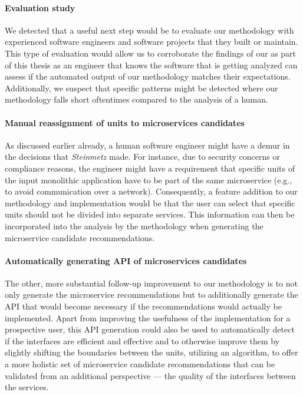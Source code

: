 \documentclass[12pt,a4paper]{report}
\begin{document}
\paragraph{Evaluation study}
We detected that a useful next step would be to
evaluate our methodology with experienced software engineers and software
projects that they built or maintain. This type of evaluation would allow us to
corroborate the findings of our \textit{} as part of
this thesis as an engineer that knows the software that is getting analyzed can
assess if the automated output of our methodology matches their expectations.
Additionally, we suspect that specific patterns might be detected where our
methodology falls short oftentimes compared to the analysis of a human.

\paragraph{Manual reassignment of units to microservices candidates}
As discussed earlier already, a human software engineer might have a demur in the
decisions that \textit{Steinmetz} made. For instance, due to security concerns
or compliance reasons, the engineer might have a requirement that specific
units of the input monolithic application have to be part of the same
microservice (e.g., to avoid communication over a network). Consequently, a
feature addition to our methodology and implementation would be that the user
can select that specific units should not be divided into separate services.
This information can then be incorporated into the analysis by the methodology
when generating the microservice candidate recommendations.

\paragraph{Automatically generating API of microservices candidates}
The other, more substantial follow-up improvement to our methodology is to not only
generate the microservice recommendations but to additionally generate the API
that would become necessary if the recommendations would actually be
implemented. Apart from improving the usefulness of the implementation for a
prospective user, this API generation could also be used to automatically
detect if the interfaces are efficient and effective and to otherwise improve
them by slightly shifting the boundaries between the units, utilizing an
algorithm, to offer a more holistic set of microservice candidate
recommendations that can be validated from an additional perspective --- the
quality of the interfaces between the services.
\end{document}
